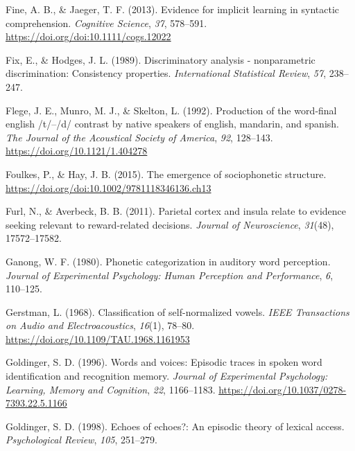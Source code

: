\documentclass[
  11pt,
  english,
  man,floatsintext]{apa6}
\newlength{\cslhangindent}
\newlength{\cslentryspacingunit} %
\newenvironment{CSLReferences}[2] %
 {%
  \setlength{\parindent}{0pt}
  \ifodd #1
  \let\oldpar\par
  \def\par{\hangindent=\cslhangindent\oldpar}
  \fi
  \setlength{\parskip}{#2\cslentryspacingunit}
 }%
 {}
\begin{document}
\begin{CSLReferences}{1}{0}
\leavevmode{}%
Fine, A. B., \& Jaeger, T. F. (2013). Evidence for implicit learning in syntactic comprehension. \emph{Cognitive Science}, \emph{37}, 578--591. \url{https://doi.org/doi:10.1111/cogs.12022}

\leavevmode{}%
Fix, E., \& Hodges, J. L. (1989). Discriminatory analysis - nonparametric discrimination: Consistency properties. \emph{International Statistical Review}, \emph{57}, 238--247.

\leavevmode{}%
Flege, J. E., Munro, M. J., \& Skelton, L. (1992). Production of the word‐final english /t/--/d/ contrast by native speakers of english, mandarin, and spanish. \emph{The Journal of the Acoustical Society of America}, \emph{92}, 128--143. \url{https://doi.org/10.1121/1.404278}

\leavevmode{}%
Foulkes, P., \& Hay, J. B. (2015). The emergence of sociophonetic structure. \url{https://doi.org/doi:10.1002/9781118346136.ch13}

\leavevmode{}%
Furl, N., \& Averbeck, B. B. (2011). Parietal cortex and insula relate to evidence seeking relevant to reward-related decisions. \emph{Journal of Neuroscience}, \emph{31}(48), 17572--17582.

\leavevmode{}%
Ganong, W. F. (1980). Phonetic categorization in auditory word perception. \emph{Journal of Experimental Psychology: Human Perception and Performance}, \emph{6}, 110--125.

\leavevmode{}%
Gerstman, L. (1968). Classification of self-normalized vowels. \emph{IEEE Transactions on Audio and Electroacoustics}, \emph{16}(1), 78--80. \url{https://doi.org/10.1109/TAU.1968.1161953}

\leavevmode{}%
Goldinger, S. D. (1996). Words and voices: Episodic traces in spoken word identification and recognition memory. \emph{Journal of Experimental Psychology: Learning, Memory and Cognition}, \emph{22}, 1166--1183. \url{https://doi.org/10.1037/0278-7393.22.5.1166}

\leavevmode{}%
Goldinger, S. D. (1998). Echoes of echoes?: An episodic theory of lexical access. \emph{Psychological Review}, \emph{105}, 251--279.


\end{CSLReferences}
\end{document}
